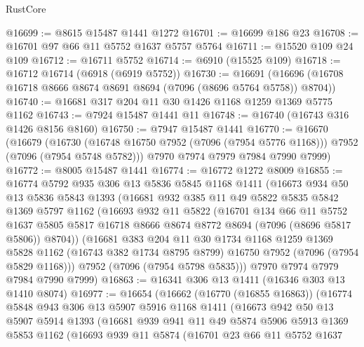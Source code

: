\begin{lexlean}{RustCore}
\begin{coremodule}
@16699 := @8615 @15487 @1441 @1272
@16701 := @16699 @186 @23
@16708 := @16701 @97 @66 @11 @5752 @1637 @5757 @5764
@16711 := @15520 @109 @24 @109
@16712 := @16711 @5752
@16714 := @6910 (@15525 @109)
@16718 := @16712 @16714 (@6918 (@6919 @5752))
@16730 := @16691 (@16696 (@16708 @16718 @8666 @8674 @8691 @8694 (@7096 (@8696 @5764 @5758)) @8704))
@16740 := @16681 @317 @204 @11 @30 @1426 @1168 @1259 @1369 @5775 @1162
@16743 := @7924 @15487 @1441 @11
@16748 := @16740 (@16743 @316 @1426 @8156 @8160)
@16750 := @7947 @15487 @1441
@16770 := @16670
    (@16679
      (@16730 (@16748 @16750 @7952 (@7096 (@7954 @5776 @1168))) @7952 (@7096 (@7954 @5748 @5782)))
      @7970
      @7974
      @7979
      @7984
      @7990
      @7999)
@16772 := @8005 @15487 @1441
@16774 := @16772 @1272 @8009
@16855 := @16774
    @5792
    @935
    @306
    @13
    @5836
    @5845
    @1168
    @1411
    (@16673
      @934
      @50
      @13
      @5836
      @5843
      @1393
      (@16681
        @932
        @385
        @11
        @49
        @5822
        @5835
        @5842
        @1369
        @5797
        @1162
        (@16693
          @932
          @11
          @5822
          (@16701
            @134
            @66
            @11
            @5752
            @1637
            @5805
            @5817
            @16718
            @8666
            @8674
            @8772
            @8694
            (@7096 (@8696 @5817 @5806))
            @8704))
        (@16681
          @383
          @204
          @11
          @30
          @1734
          @1168
          @1259
          @1369
          @5828
          @1162
          (@16743 @382 @1734 @8795 @8799)
          @16750
          @7952
          (@7096 (@7954 @5829 @1168)))
        @7952
        (@7096 (@7954 @5798 @5835)))
      @7970
      @7974
      @7979
      @7984
      @7990
      @7999)
@16863 := @16341 @306 @13 @1411 (@16346 @303 @13 @1410 @8074)
@16977 := @16654
    (@16662
      (@16770 (@16855 @16863))
      (@16774
        @5848
        @943
        @306
        @13
        @5907
        @5916
        @1168
        @1411
        (@16673
          @942
          @50
          @13
          @5907
          @5914
          @1393
          (@16681
            @939
            @941
            @11
            @49
            @5874
            @5906
            @5913
            @1369
            @5853
            @1162
            (@16693
              @939
              @11
              @5874
              (@16701
                @23
                @66
                @11
                @5752
                @1637

\end{coremodule}
\end{lexlean}
